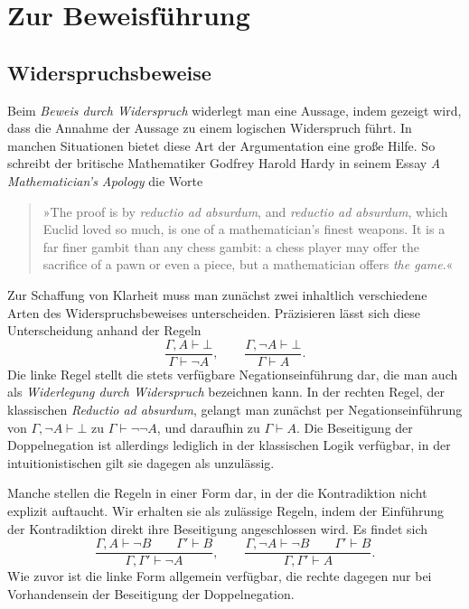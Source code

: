 \section{Zur Beweisführung}

\subsection{Widerspruchsbeweise}

Beim \emph{Beweis durch Widerspruch} widerlegt man eine Aussage, indem
gezeigt wird, dass die Annahme der Aussage zu einem logischen
Widerspruch führt. In manchen Situationen bietet
diese Art der Argumentation eine große Hilfe. So schreibt der britische
Mathematiker Godfrey Harold Hardy in seinem Essay
\emph{A Mathematician's Apology} die Worte
\begin{quote}
»The proof is by \emph{reductio ad absurdum}, and \emph{reductio ad
absurdum}, which Euclid loved so much, is one of a mathematician's
finest weapons. It is a far finer gambit than any chess gambit: a chess
player may offer the sacrifice of a pawn or even a piece, but a
mathematician offers \emph{the game}.«
\end{quote}
Zur Schaffung von Klarheit muss man zunächst zwei inhaltlich
verschiedene Arten des Widerspruchsbeweises unterscheiden.
Präzisieren lässt sich diese Unterscheidung anhand
der Regeln
\[\dfrac{\Gamma,A\vdash\bot}{\Gamma\vdash\lnot A},\qquad
\dfrac{\Gamma,\lnot A\vdash\bot}{\Gamma\vdash A}.\]
Die linke Regel stellt die stets verfügbare Negationseinführung dar,
die man auch als \emph{Widerlegung durch Widerspruch} bezeichnen kann.
In der rechten Regel, der klassischen \emph{Reductio ad absurdum},
gelangt man zunächst per Negationseinführung von
$\Gamma,\lnot A\vdash\bot$ zu $\Gamma\vdash\lnot\lnot A$, und daraufhin
zu $\Gamma\vdash A$. Die Beseitigung der Doppelnegation%
 ist allerdings lediglich in der klassischen
Logik verfügbar, in der intuitionistischen gilt sie dagegen als
unzulässig.

Manche stellen die Regeln in einer Form dar, in der die Kontradiktion
nicht explizit auftaucht. Wir erhalten sie als zulässige Regeln, indem
der Einführung der Kontradiktion direkt ihre Beseitigung
angeschlossen wird. Es findet sich
\[\dfrac{\Gamma,A\vdash\lnot B\qquad\Gamma'\vdash B}
{\Gamma,\Gamma'\vdash\lnot A},\qquad
\dfrac{\Gamma,\lnot A\vdash\lnot B\qquad\Gamma'\vdash B}
{\Gamma,\Gamma'\vdash A}.\]
Wie zuvor ist die linke Form allgemein verfügbar, die rechte dagegen
nur bei Vorhandensein der Beseitigung der Doppelnegation.

